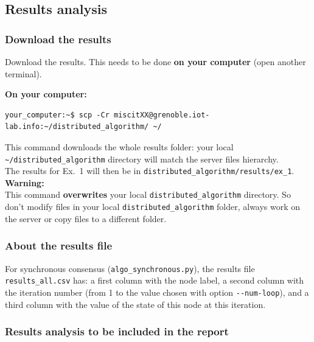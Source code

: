 \documentclass[oneside]{article}
\begin{document}
\subsection{Results analysis}

\subsubsection{Download the results}
Download the results. This needs to be done \textbf{on your computer} (open another terminal).

\textbf{On your computer:} 
\begin{verbatim}
your_computer:~$ scp -Cr miscitXX@grenoble.iot-lab.info:~/distributed_algorithm/ ~/
\end{verbatim}
This command downloads the whole results folder:
your local \verb=~/distributed_algorithm= directory will match the server files hierarchy.\\
The results for Ex.~1 will then be in \verb=distributed_algorithm/results/ex_1=.\\
\textbf{Warning:} \\ This command \textbf{overwrites} your local \verb=distributed_algorithm= directory. So don't modify files in your local \verb=distributed_algorithm= folder, always work on the server or copy files to a different folder.

\subsubsection{About the results file}

For synchronous consensus (\verb=algo_synchronous.py=), the results file
\verb=results_all.csv= has:
a first column with the node label, 
a second column with the iteration number (from 1 to the value chosen with option \verb=--num-loop=), 
and a third column with the value of the state of this node at this iteration.




\subsubsection{Results analysis to be included in the report}
\end{document}
